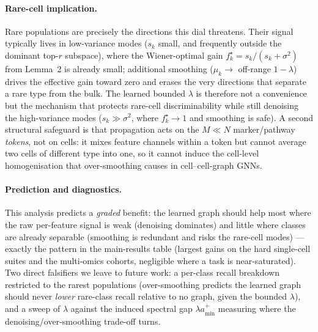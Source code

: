 \documentclass[letterpaper]{article}
\begin{document}
\paragraph{Rare-cell implication.} Rare populations are precisely the directions this dial threatens.
Their signal typically lives in low-variance modes ($s_k$ small, and frequently outside the dominant
top-$r$ subspace), where the Wiener-optimal gain $f_k^\star=s_k/(s_k+\sigma^2)$ from Lemma~2 is already
small; additional smoothing ($\mu_k\to$ off-range $1-\lambda$) drives the effective gain toward zero
and erases the very directions that separate a rare type from the bulk. The learned bounded $\lambda$
is therefore not a convenience but the mechanism that protects rare-cell discriminability while still
denoising the high-variance modes ($s_k\gg\sigma^2$, where $f_k^\star\to1$ and smoothing is safe).
A second structural safeguard is that propagation acts on the $M\ll N$ marker/pathway \emph{tokens},
not on cells: it mixes feature channels within a token but cannot average two cells of different type
into one, so it cannot induce the cell-level homogenisation that over-smoothing causes in
cell--cell-graph GNNs.

\paragraph{Prediction and diagnostics.} This analysis predicts a \emph{graded} benefit: the learned
graph should help most where the raw per-feature signal is weak (denoising dominates) and little where
classes are already separable (smoothing is redundant and risks the rare-cell modes) --- exactly the
pattern in the main-results table (largest gains on the hard single-cell suites and the multi-omics
cohorts, negligible where a task is near-saturated). Two direct falsifiers we leave to future work: a
per-class recall breakdown restricted to the rarest populations (over-smoothing predicts the learned
graph should never \emph{lower} rare-class recall relative to no graph, given the bounded $\lambda$),
and a sweep of $\lambda$ against the induced spectral gap $\lambda a_{\min}^{+}$ measuring where the
denoising/over-smoothing trade-off turns.



\end{document}
